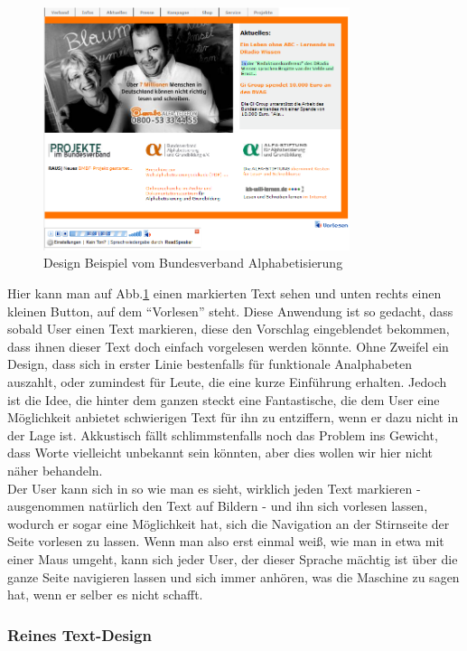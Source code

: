 \begin{figure}[h]
	\centering
		\includegraphics[width=0.80\textwidth]{Daten/DesignBeispiel1.png}
	\caption{Design Beispiel vom Bundesverband Alphabetisierung}
	\label{fig:DesignBeispiel1}
\end{figure}

Hier kann man auf Abb.\ref{fig:DesignBeispiel1} einen markierten Text sehen und unten rechts einen kleinen Button, auf dem "`Vorlesen"' steht. Diese Anwendung ist so gedacht, dass sobald User einen Text markieren, diese den Vorschlag eingeblendet bekommen, dass ihnen dieser Text doch einfach vorgelesen werden könnte. Ohne Zweifel ein Design, dass sich in erster Linie bestenfalls für funktionale Analphabeten auszahlt, oder zumindest für Leute, die eine kurze Einführung erhalten. Jedoch ist die Idee, die hinter dem ganzen steckt eine Fantastische, die dem User eine Möglichkeit anbietet schwierigen Text für ihn zu entziffern, wenn er dazu nicht in der Lage ist. Akkustisch fällt schlimmstenfalls noch das Problem ins Gewicht, dass Worte vielleicht unbekannt sein könnten, aber dies wollen wir hier nicht näher behandeln.\\
Der User kann sich in so wie man es sieht, wirklich jeden Text markieren - ausgenommen natürlich den Text auf Bildern - und ihn sich vorlesen lassen, wodurch er sogar eine Möglichkeit hat, sich die Navigation an der Stirnseite der Seite vorlesen zu lassen. Wenn man also erst einmal weiß, wie man in etwa mit einer Maus umgeht, kann sich jeder User, der dieser Sprache mächtig ist über die ganze Seite navigieren lassen und sich immer anhören, was die Maschine zu sagen hat, wenn er selber es nicht schafft.\\
\newpage
\subsubsection{Reines Text-Design}

